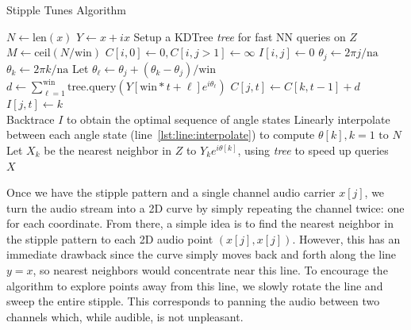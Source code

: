 \documentclass{article}
\begin{document}
\algrenewcommand\algorithmicindent{0.8em}%
\begin{algorithm}
  \caption{Stipple Tunes Algorithm}

  \begin{algorithmic}[1]
     
    \State $N \gets \text{len}(x)$ 
    \State $Y \gets x + ix$
    \State Setup a KDTree {\em tree} for fast NN queries on $Z$
    \State $M \gets \text{ceil}(N / \text{win})$
    \State $C[i, 0] \gets 0, C[i, j > 1] \gets \infty$ 
    \State $I[i, j] \gets 0$ 
            \State $\theta_j \gets 2 \pi j / \text{na}$
                \State $\theta_k \gets 2 \pi k / \text{na}$ \label{lst:line:interpolate}
                \State Let $\theta_{\ell} \gets \theta_j + (\theta_k-\theta_j)/\text{win}$ 
                \State $d \gets \sum_{\ell = 1}^{\text{win}} \text{tree.query}(Y[\text{win}*t + \ell] e^{i \theta_{\ell}})$ 
                    \State $C[j, t] \gets C[k, t-1] + d$ 
                    \State $I[j, t] \gets k$  
                \EndIf
            \EndFor
        \EndFor
    \EndFor \\
    \State Backtrace $I$ to obtain the optimal sequence of angle states
    \State Linearly interpolate between each angle state (line~\ref{lst:line:interpolate}) to compute $\theta[k], k = 1 \text{ to } N$ 
    \State Let $X_k$ be the nearest neighbor in $Z$ to $Y_k e^{i \theta[k]}$, using {\em tree} to speed up queries \\
    \Return $X$
    \EndProcedure
  \end{algorithmic}
  \label{alg:stippletunes}
\end{algorithm}

Once we have the stipple pattern and a single channel audio carrier $x[j]$, we turn the audio stream into a 2D curve by simply repeating the channel twice: one for each coordinate.  From there, a simple idea is to find the nearest neighbor in the stipple pattern to each 2D audio point $(x[j], x[j])$.  However, this has an immediate drawback since the curve simply moves back and forth along the line $y=x$, so nearest neighbors would concentrate near this line.  To encourage the algorithm to explore points away from this line, we slowly rotate the line and sweep the entire stipple.  This corresponds to panning the audio between two channels which, while audible, is not unpleasant.
\end{document}

